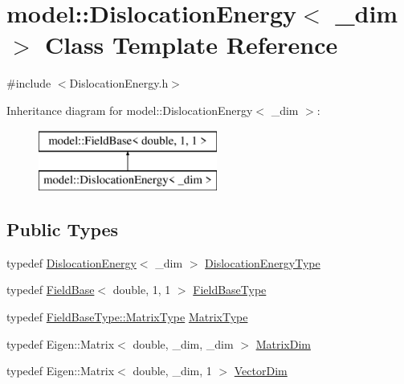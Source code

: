 \hypertarget{classmodel_1_1_dislocation_energy}{}\section{model\+:\+:Dislocation\+Energy$<$ \+\_\+dim $>$ Class Template Reference}
\label{classmodel_1_1_dislocation_energy}


{\ttfamily \#include $<$Dislocation\+Energy.\+h$>$}

Inheritance diagram for model\+:\+:Dislocation\+Energy$<$ \+\_\+dim $>$\+:\begin{figure}[H]
\begin{center}
\leavevmode
\includegraphics[height=2.000000cm]{classmodel_1_1_dislocation_energy}
\end{center}
\end{figure}
\subsection*{Public Types}
\begin{DoxyCompactItemize}
\item 
typedef \hyperlink{classmodel_1_1_dislocation_energy}{Dislocation\+Energy}$<$ \+\_\+dim $>$ \hyperlink{classmodel_1_1_dislocation_energy_a8216800b4c91c557e11de7978015d1d8}{Dislocation\+Energy\+Type}
\item 
typedef \hyperlink{structmodel_1_1_field_base}{Field\+Base}$<$ double, 1, 1 $>$ \hyperlink{classmodel_1_1_dislocation_energy_accde9d41283a093975013ee9b144fced}{Field\+Base\+Type}
\item 
typedef \hyperlink{structmodel_1_1_field_base_a2a46afe1dafac6e3d1c95d32fc9a58a3}{Field\+Base\+Type\+::\+Matrix\+Type} \hyperlink{classmodel_1_1_dislocation_energy_a3cb7da857732ef0ffe2ed45d06737097}{Matrix\+Type}
\item 
typedef Eigen\+::\+Matrix$<$ double, \+\_\+dim, \+\_\+dim $>$ \hyperlink{classmodel_1_1_dislocation_energy_ab88bf490cc2bac987ef0da961a7c9762}{Matrix\+Dim}
\item 
typedef Eigen\+::\+Matrix$<$ double, \+\_\+dim, 1 $>$ \hyperlink{classmodel_1_1_dislocation_energy_a8489d465a19e782a7d74db70c6bcde18}{Vector\+Dim}
\end{DoxyCompactItemize}
